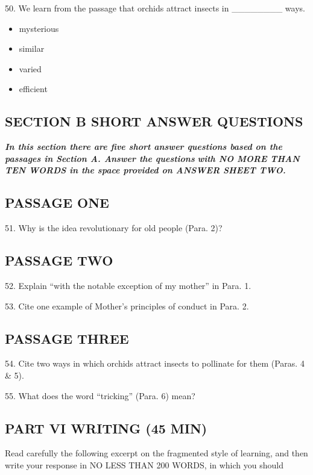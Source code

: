 \documentclass[UTF8,11pt]{ctexart}
\begin{document}
50. We learn from the passage that orchids attract insects in \_\_\_\_\_\_\_\_ ways.


\begin{itemize}[leftmargin=2em,itemsep=.2em,topsep=.4em]\item[A.] mysterious
\item[B.] similar
\item[C.] varied
\item[D.] efficient
\end{itemize}

\subsection*{\textbf{SECTION B SHORT ANSWER QUESTIONS}}


\textbf{\textit{In this section there are five short answer questions based on the passages in Section A. Answer the questions}} \textbf{\textit{with NO MORE THAN TEN WORDS in the space provided on ANSWER SHEET TWO.}}


\subsection*{\textbf{PASSAGE} \textbf{ONE}}


51. Why is the idea revolutionary for old people (Para. 2)?


\subsection*{\textbf{PASSAGE TWO}}


52. Explain “with the notable exception of my mother” in Para. 1.


53. Cite one example of Mother’s principles of conduct in Para. 2.


\subsection*{\textbf{PASSAGE THREE}}


54. Cite two ways in which orchids attract insects to pollinate for them (Paras. 4 \& 5).


55. What does the word “tricking” (Para. 6) mean?


\subsection*{\textbf{PART VI WRITING (45 MIN)}}


Read carefully the following excerpt on the fragmented style of learning, and then write your response in NO LESS THAN 200 WORDS, in which you should
\end{document}
